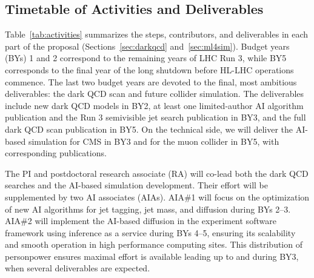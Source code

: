 \subsection{Timetable of Activities and Deliverables}

Table~\ref{tab:activities} summarizes the steps, contributors, and deliverables in each part of the proposal (Sections~\ref{sec:darkqcd} and~\ref{sec:ml4sim}).
Budget years (BYs) 1 and 2 correspond to the remaining years of LHC Run 3, while BY5 corresponds to the final year of the long shutdown before HL-LHC operations commence.
The last two budget years are devoted to the final, most ambitious deliverables: the dark QCD scan and future collider simulation.
The deliverables include new dark QCD models in BY2, at least one limited-author AI algorithm publication and the Run 3 semivisible jet search publication in BY3, and the full dark QCD scan publication in BY5.
On the technical side, we will deliver the AI-based simulation for CMS in BY3 and for the muon collider in BY5, with corresponding publications.

The PI and postdoctoral research associate (RA) will co-lead both the dark QCD searches and the AI-based simulation development.
Their effort will be supplemented by two AI associates (AIAs).
AIA\#1 will focus on the optimization of new AI algorithms for jet tagging, jet mass, and diffusion during BYs 2--3.
AIA\#2 will implement the AI-based diffusion in the experiment software framework using inference as a service during BYs 4--5, ensuring its scalability and smooth operation in high performance computing sites.
This distribution of personpower ensures maximal effort is available leading up to and during BY3, when several deliverables are expected.

